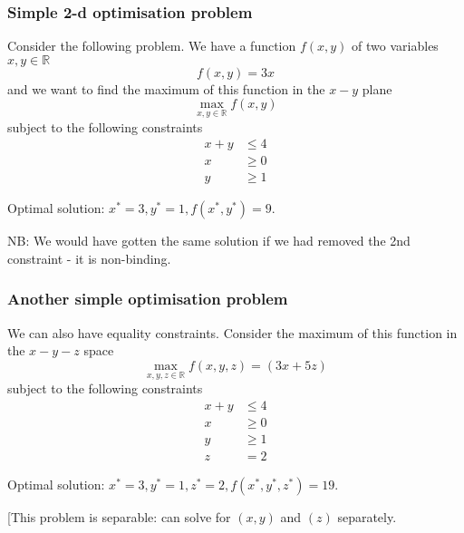 \documentclass[10pt,aspectratio=169,dvipsnames]{beamer}
\begin{document}
\begin{frame}
  \frametitle{Simple 2-d optimisation problem}

  Consider the following problem. We have a function $f(x,y)$ of two variables $x,y\in \mathbb{R}$
  \begin{equation*}
    f(x,y) = 3x
  \end{equation*}
  and we want to find the maximum of this function in the $x-y$ plane
  \begin{equation*}
    \max_{x,y\in \mathbb{R}} f(x,y)
  \end{equation*}
  subject to the following constraints
  \begin{align}
    x + y & \leq 4 \\
    x & \geq 0 \\
    y & \geq 1
  \end{align}

  \alert{Optimal solution:} $x^* = 3, y^* = 1, f(x^*,y^*) = 9$.

  NB: We would have gotten the same solution if we had removed the 2nd constraint - it is \alert{non-binding}.
\end{frame}


\begin{frame}
  \frametitle{Another simple optimisation problem}

  We can also have equality constraints. Consider the maximum of this function in the $x-y-z$ space
  \begin{equation*}
    \max_{x,y,z\in \mathbb{R}} f(x,y,z) =  (3x + 5z)
  \end{equation*}
  subject to the following constraints
  \begin{align*}
    x + y & \leq 4 \\
    x & \geq 0 \\
    y & \geq 1 \\
    z & = 2
  \end{align*}

  \pause
  \alert{Optimal solution:} $x^* = 3, y^* = 1, z^* = 2, f(x^*,y^*,z^*) = 19$.

  [This problem is \alert{separable}: can solve for $(x,y)$ and $(z)$ separately.
\end{frame}
\end{document}
